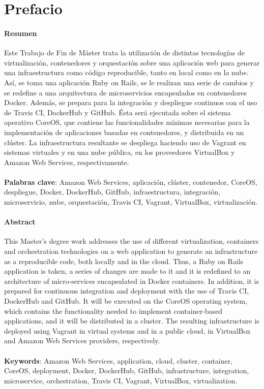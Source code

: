 \chapter{Prefacio}

\subsubsection{Resumen}
Este Trabajo de Fin de Máster trata la utilización de distintas tecnologías de virtualización, contenedores y orquestación sobre una aplicación web para generar una infraestructura como código reproducible, tanto en local como en la nube. Así, se toma una aplicación Ruby on Rails, se le realizan una serie de cambios y se redefine a una arquitectura de microservicios encapsulados en contenedores Docker. Además, se prepara para la integración y despliegue continuos con el uso de Travis CI, DockerHub y GitHub. Ésta será ejecutada sobre el sistema operativo CoreOS, que contiene las funcionalidades mínimas necesarias para la implementación de aplicaciones basadas en contenedores, y distribuida en un clúster. La infraestructura resultante se despliega haciendo uso de Vagrant en sistemas virtuales y en una nube pública, en los proveedores VirtualBox y Amazon Web Services, respectivamente. 
\\
\\
\textbf{Palabras clave}: Amazon Web Services, aplicación, clúster, contenedor, CoreOS, despliegue, Docker, DockerHub, GitHub, infraestructura, integración, microservicio, nube, orquestación, Travis CI, Vagrant, VirtualBox, virtualización.

\subsubsection{Abstract}
This Master's degree work addresses the use of different virtualization, containers and orchestration technologies on a web application to generate an infrastructure as a reproducible code, both locally and in the cloud. Thus, a Ruby on Rails application is taken, a series of changes are made to it and it is redefined to an architecture of micro-services encapsulated in Docker containers. In addition, it is prepared for continuous integration and deployment with the use of Travis CI, DockerHub and GitHub. It will be executed on the CoreOS operating system, which contains the functionality needed to implement container-based applications, and it will be distributed in a cluster. The resulting infrastructure is deployed using Vagrant in virtual systems and in a public cloud, in VirtualBox and Amazon Web Services providers, respectively.
\\
\\
\textbf{Keywords}: Amazon Web Services, application, cloud, cluster, container, CoreOS, deployment, Docker, DockerHub, GitHub, infrastructure, integration, microservice, orchestration, Travis CI, Vagrant, VirtualBox, virtualization.
